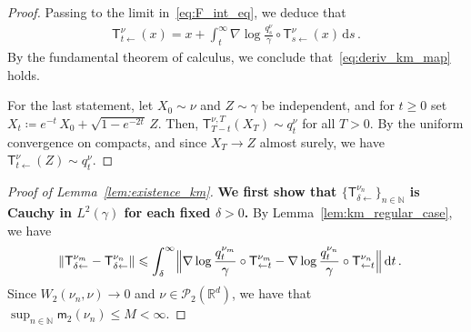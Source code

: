 \documentclass[12pt]{article}
\newcommand{\cP}{\mathcal{P}}
\newcommand{\RR}{\mathbb{R}}
\newcommand{\R}{\RR}
\newcommand{\N}{\mathbb{N}}
\newcommand{\1}{\mathds{1}}
\newcommand*{\rd}{\mathrm{d}}
\newcommand*{\dd}{\, \rd}
\newcommand{\deq}{\coloneqq}
\renewcommand{\ge}{\geqslant}
\renewcommand{\le}{\leqslant}
\newcommand{\KM}{\mathsf T}
\newcommand{\mom}{\mathsf m_2}
\theoremstyle{plain}
\theoremstyle{definition}
\theoremstyle{remark}
\begin{document}
\begin{proof}
    Passing to the limit in~\eqref{eq:F_int_eq}, we deduce that
    \begin{align*}
        \KM^\nu_{t\gets}(x) = x + \int_t^\infty \nabla \log \frac{q_s^\nu}{\gamma} \circ \KM^\nu_{s\gets}(x)\dd s\,.
    \end{align*}
    By the fundamental theorem of calculus, we conclude that~\eqref{eq:deriv_km_map} holds.

    For the last statement, let $X_0 \sim \nu$ and $Z \sim \gamma$ be independent, and for $t \ge 0$ set $X_t \deq e^{-t}\,X_0 + \sqrt{1-e^{-2t}}\,Z$.
    Then, $\KM^{\nu,T}_{T-t}(X_T) \sim q_t^\nu$ for all $T > 0$.
    By the uniform convergence on compacts, and since $X_T \to Z$ almost surely, we have $\KM^\nu_{t \gets}(Z) \sim q_t^\nu$.
\end{proof}

\begin{proof}[Proof of Lemma~\ref{lem:existence_km}]
    \textbf{We first show that $\{\KM^{\nu_n}_{\delta\gets}\}_{n\in\N}$ is Cauchy in $L^2(\gamma)$ for each fixed $\delta > 0$.}
    By Lemma~\ref{lem:km_regular_case}, we have
    \begin{align*}
        \|\KM^{\nu_m}_{\delta\gets} - \mathsf T^{\nu_{n}}_{\delta\gets}\|
        &\le \int_\delta^\infty\Bigl\lVert \nabla \log \frac{q_t^{\nu_m}}{\gamma} \circ \KM^{\nu_m}_{\gets t} - \nabla \log \frac{q_t^{\nu_n}}{\gamma} \circ \KM^{\nu_n}_{\gets t}\Bigr\rVert\dd t\,.
    \end{align*}
    Since $W_2(\nu_n,\nu) \to 0$ and $\nu \in \cP_2(\R^d)$, we have that $\sup_{n\in\N} \mom(\nu_n) \le M < \infty$.


\end{proof}
\end{document}
